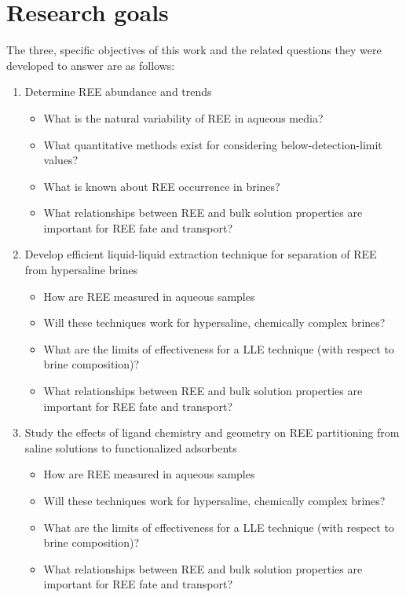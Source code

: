 \section{Research goals}

The three, specific objectives of this work and the related questions they were developed to answer are as follows:
\begin{enumerate}
\item Determine REE abundance and trends
	\begin{itemize}
		\item What is the natural variability of REE in aqueous media?
		\item What quantitative methods exist for considering below-detection-limit values?
		\item What is known about REE occurrence in brines?
		\item What relationships between REE and bulk solution properties are important for REE fate and transport?
	\end{itemize}
\item Develop efficient liquid-liquid extraction technique for separation of REE from hypersaline brines
	\begin{itemize}
		\item How are REE measured in aqueous samples
		\item Will these techniques work for hypersaline, chemically complex brines?
		\item What are the limits of effectiveness for a LLE technique (with respect to brine composition)?
		\item What relationships between REE and bulk solution properties are important for REE fate and transport?
	\end{itemize}
\item Study the effects of ligand chemistry and geometry on REE partitioning from saline solutions to functionalized adsorbents
	\begin{itemize}
		\item How are REE measured in aqueous samples
		\item Will these techniques work for hypersaline, chemically complex brines?
		\item What are the limits of effectiveness for a LLE technique (with respect to brine composition)?
		\item What relationships between REE and bulk solution properties are important for REE fate and transport?
	\end{itemize}
\end{enumerate}



